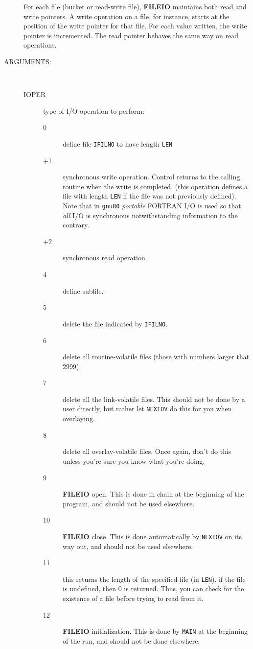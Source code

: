 \begin{description}
For each file (bucket or read-write  file),  {\bf FILEIO}  
maintains  both  read  and  write pointers.  A write operation on a
file, for instance, starts at the position of the write pointer
for  that  file.   For each value written, the write pointer is
incremented.  The read pointer behaves the same way on read operations.
\item[ARGUMENTS:] \ \\
\begin{description}
\item[IOPER]   type of I/O operation to perform:
\begin{description} 
\item[0] define file   {\tt IFILNO}  to have length  {\tt LEN}   
\item[+1]  synchronous write operation. Control   returns  to  the
calling routine when the write is completed.
(this operation defines a file with length {\tt LEN} if the file
was not previously defined). Note that in {\tt gnu80} {\em portable}
FORTRAN I/O is used so that {\em all } I/O is synchronous notwithstanding
information to the contrary.
\item[+2]  synchronous read operation.
\item[4]  define subfile.
\item[5]  delete the file indicated by {\tt IFILNO}.
\item[6]  delete all routine-volatile files (those  with  numbers
larger that 2999).
\item[7]  delete all the link-volatile files.  This should  not
be done by a user directly, but rather let {\tt NEXTOV} do this
for you when overlaying.
\item[8]  delete all overlay-volatile files.  Once again, don't do
this unless you're sure you know what you're doing.
\item[9]  {\bf FILEIO} open.  This is done in chain at the beginning of
the program, and should not be used elsewhere.
\item[10]  {\bf FILEIO} close.  This is done automatically by {\tt NEXTOV} on
its way out, and should not be used elsewhere.
\item[11]  this returns the length of the specified file (in {\tt LEN}).
if the file is undefined, then 0 is returned.  Thus,
you can check for the existence of a file before trying
to read from it.
\item[12]  {\bf FILEIO} initialization. This is done by {\tt MAIN} at the
beginning of the run, and should not be done elsewhere.
\end{description}

\end{description}
\end{description}
